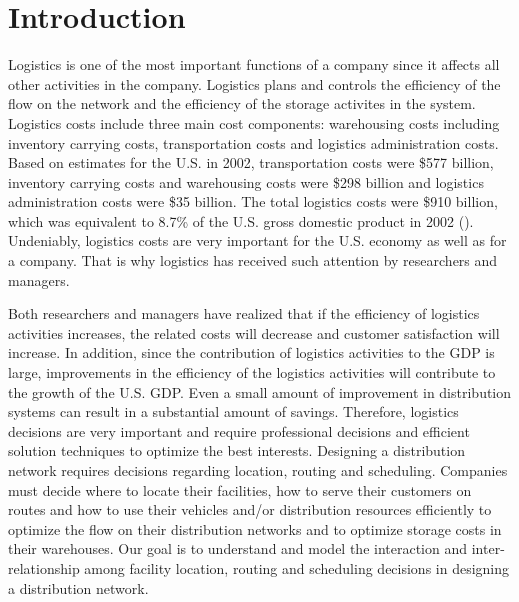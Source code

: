 \chapter {Introduction}

Logistics is one of the most important functions of a company
since it affects all other activities in the company. 
Logistics plans and controls the efficiency of the flow on the network and 
the efficiency of the storage activites in the system.
Logistics costs include three main cost components: warehousing costs including 
inventory carrying costs, transportation costs and logistics administration costs. 
Based on estimates for the U.S. in 2002, transportation costs were \$577 billion, 
inventory carrying costs and warehousing costs were \$298 billion 
and logistics administration costs were \$35 billion. The total logistics 
costs were \$910 billion, which was equivalent to 8.7\% of the U.S. gross 
domestic product in 2002 (\citet{MacroSys}). Undeniably, logistics
costs are very important for the U.S. economy as well as for a company. 
That is why logistics has received such attention by researchers and managers.   

Both researchers and managers have realized that if the efficiency of logistics activities increases, 
the related costs will decrease and customer satisfaction will increase. 
In addition, since the contribution of logistics activities to the GDP is
large, improvements in the efficiency of the logistics activities will contribute to the 
growth of the U.S. GDP.  Even a small amount of improvement in distribution systems
can result in a substantial amount of savings. Therefore, logistics 
decisions are very important and require professional decisions and
efficient solution techniques to optimize the best interests.
Designing a distribution network requires decisions regarding 
location, routing and scheduling. Companies must decide
where to locate their facilities, how to serve their customers
on routes and how to use their vehicles and/or 
distribution resources efficiently to optimize the flow on their
distribution networks and to optimize storage costs in their warehouses.  
Our goal is to understand and model the interaction and inter-relationship among facility
location, routing and scheduling decisions  in designing a distribution network. 




